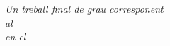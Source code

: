 \documentclass[
11pt, %
catalan,
english,
spanish,
singlespacing, %
headsepline, %
]{MastersDoctoralThesis} %
\begin{document}
\begin{titlepage}
\begin{center}
\vfill

\large \textit{Un treball final de grau corresponent\\ al \degreename}\\[0.3cm] %
\textit{en el}\\[0.4cm]
\deptname\\[0.4cm] %
\facname\\[1.5cm]
\vfill

{\large {}}\\[4cm] %
 
\vfill
\end{center}
\end{titlepage}


\end{document}
